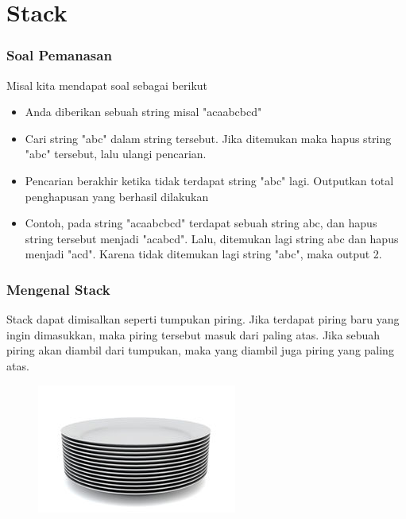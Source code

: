 \section{Stack}
\frame{\sectionpage}

\begin{frame}
\frametitle{Soal Pemanasan}

Misal kita mendapat soal sebagai berikut
\begin{itemize}
	\item Anda diberikan sebuah string misal "acaabcbcd"
	\item Cari string "abc" dalam string tersebut. Jika ditemukan maka hapus string "abc" tersebut, lalu ulangi pencarian.
	\item Pencarian berakhir ketika tidak terdapat string "abc" lagi. Outputkan total penghapusan yang berhasil dilakukan
	\item Contoh, pada string "acaabcbcd" terdapat sebuah string abc, dan hapus string tersebut menjadi "acabcd". Lalu, ditemukan lagi string abc dan hapus menjadi "acd". Karena tidak ditemukan lagi string "abc", maka output 2.
\end{itemize}
\end{frame}

\begin{frame}
\frametitle{Mengenal Stack}

Stack dapat dimisalkan seperti tumpukan piring. Jika terdapat piring baru yang ingin dimasukkan, maka piring tersebut masuk dari paling atas. Jika sebuah piring akan diambil dari tumpukan, maka yang diambil juga piring yang paling atas.

\begin{figure}
	\centering
	\includegraphics[width=4 cm]{asset/plates-stack.jpg}
\end{figure}

\end{frame}


